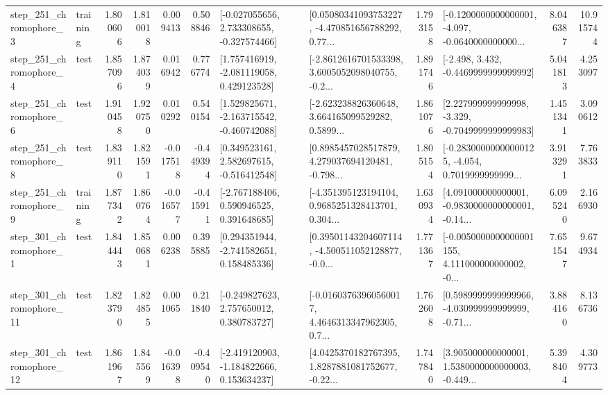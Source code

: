 \begin{tabular}{llrrrrllrlrr}
   step\_251\_chromophore\_3 &  training &      1.800606 &    1.810018 &      0.009413 &  0.508846 &   [-0.027055656, 2.733308655, -0.327574466] &  [0.05080341093753227, -4.470851656788292, 0.77... &       1.793158 &  [-0.1200000000000001, -4.097, -0.0640000000000... &            8.046387 &         10.915744 \\
   step\_251\_chromophore\_4 &      test &      1.857096 &    1.874039 &      0.016942 &  0.776774 &    [1.757416919, -2.081119058, 0.429123528] &  [-2.8612616701533398, 3.6005052098040755, -0.2... &       1.891746 &               [-2.498, 3.432, -0.4469999999999992] &            5.041813 &          4.253097 \\
   step\_251\_chromophore\_6 &      test &      1.910458 &    1.920750 &      0.010292 &  0.540154 &   [1.529825671, -2.163715542, -0.460742088] &  [-2.623238826360648, 3.664165099529282, 0.5899... &       1.861076 &   [2.227999999999998, -3.329, -0.7049999999999983] &            1.451341 &          3.090612 \\
   step\_251\_chromophore\_8 &      test &      1.839110 &    1.821591 &     -0.017518 & -0.449394 &    [0.349523161, 2.582697615, -0.516412548] &  [0.8985457028517879, 4.279037694120481, -0.798... &       1.805154 &  [-0.28300000000000125, -4.054, 0.7019999999999... &            3.913291 &          7.763833 \\
   step\_251\_chromophore\_9 &  training &      1.877342 &    1.860764 &     -0.016577 & -0.415911 &    [-2.767188406, 0.590946525, 0.391648685] &  [-4.351395123194104, 0.9685251328413701, 0.304... &       1.630934 &  [4.091000000000001, -0.9830000000000001, -0.14... &            6.095240 &          2.166930 \\
   step\_301\_chromophore\_1 &      test &      1.844443 &    1.850681 &      0.006238 &  0.395885 &    [0.294351944, -2.741582651, 0.158485336] &  [0.39501143204607114, -4.500511052128877, -0.0... &       1.771367 &  [-0.0050000000000001155, 4.111000000000002, -0... &            7.651547 &          9.674934 \\
  step\_301\_chromophore\_11 &      test &      1.823790 &    1.824855 &      0.001065 &  0.211840 &    [-0.249827623, 2.757650012, 0.380783727] &  [-0.01603763960560017, 4.4646313347962305, 0.7... &       1.762608 &  [0.5989999999999966, -4.030999999999999, -0.71... &            3.884160 &          8.136736 \\
  step\_301\_chromophore\_12 &      test &      1.861967 &    1.845569 &     -0.016398 & -0.409540 &   [-2.419120903, -1.184822666, 0.153634237] &  [4.0425370182767395, 1.8287881081752677, -0.22... &       1.747840 &  [3.905000000000001, 1.5380000000000003, -0.449... &            5.398404 &          4.309773 \\

\end{tabular}
